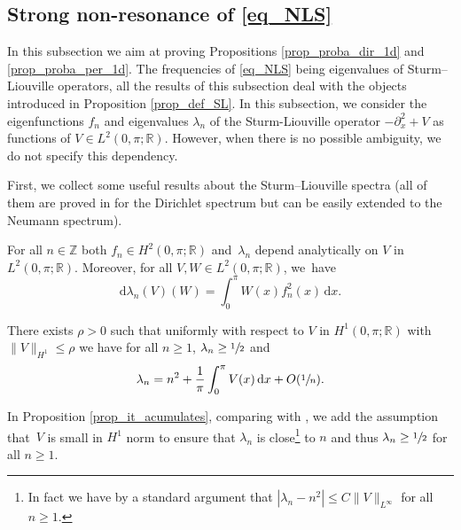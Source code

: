 \subsection{Strong non-resonance of \eqref{eq_NLS}} In this subsection we aim at proving Propositions \ref{prop_proba_dir_1d} and \ref{prop_proba_per_1d}. The frequencies of \eqref{eq_NLS} being eigenvalues of Sturm--Liouville operators, all the results of this subsection deal with the objects introduced in Proposition \ref{prop_def_SL}. In this subsection, we consider the eigenfunctions $f_n$ and eigenvalues $\lambda_n$ of the Sturm-Liouville operator $-\partial_x^2 +V$ as functions of $V \in L^2(0,\pi;\mathbb{R})$. However, when there is no possible ambiguity, we do not specify this dependency.

First, we collect some useful results about the Sturm--Liouville spectra (all of them are proved in \cite{PT} for the Dirichlet spectrum but can be easily extended to the Neumann spectrum).
\begin{proposition}[{\cite[Th.\,3, p.\,31]{PT}}] \label{prop_smooth_spec} For all $n\in \mathbb{Z}$ both $f_n \in H^2(0,\pi;\mathbb{R})$ and~$\lambda_n$ depend analytically on $V$ in $L^2(0,\pi;\mathbb{R})$. Moreover, for all $V,W \in L^2(0,\pi;\mathbb{R})$, we~have%
\begin{equation}
\label{eq_diff_lambda}
\mathrm{d} \lambda_n (V)(W) = \int_0^\pi W(x) f_n^2(x) \, \mathrm{d}x.
\end{equation}
\end{proposition}

\begin{proposition}[{\cite[Th.\,4, p.\,35]{PT}}]
\label{prop_it_acumulates} {There exists $\rho>0$ such that} uniformly with respect to $V$ in $H^1(0,\pi;\mathbb{R})$ with
$\|V\|_{H^1}\leq \rho$
we have for all $n\geq1$, $\lambda_n \geq\sfrac12$ and
\[
\lambda_n = n^2 + \frac1\pi \int_{0}^{\pi} V(x)\, \mathrm{d}x + O(\sfrac1n).
\]
\end{proposition}
In Proposition \ref{prop_it_acumulates}, comparing with \cite[Th.\,4 p.\,35]{PT}, we add the assumption that~$V$ is small in $H^1$ norm to ensure that $\lambda_n$ is close\footnote{In fact we have by a standard argument that $|\lambda_n -n^2|\leq C\| V\|_{L^\infty}$ for all $n\geq1$.} to $n$ and thus $\lambda_n \geq\sfrac12$ for all $n\geq1$.

